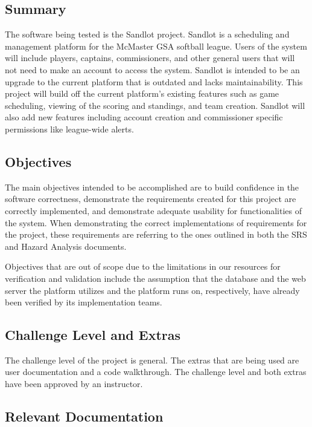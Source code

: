 \documentclass[12pt, titlepage]{article}
\begin{document}
\subsection{Summary}

The software being tested is the Sandlot project. Sandlot is a scheduling and
management platform for the McMaster GSA softball league. Users of the system
will include players, captains, commissioners, and other general users that will
not need to make an account to access the system. Sandlot is intended to be an
upgrade to the current platform that is outdated and lacks maintainability. This
project will build off the current platform's existing features such as game
scheduling, viewing of the scoring and standings, and team creation. Sandlot will
also add new features including account creation and commissioner specific
permissions like league-wide alerts.

\subsection{Objectives}

The main objectives intended to be accomplished are to build confidence in the software
correctness, demonstrate the requirements created for this project are correctly
implemented, and demonstrate adequate usability for functionalities of the
system. When demonstrating the correct implementations of requirements for the
project, these requirements are referring to the ones outlined in both the
SRS and Hazard Analysis documents.

Objectives that are out of scope due to the limitations in our resources for
verification and validation include the assumption that the database and the web
server the platform utilizes and the platform runs on, respectively, have already
been verified by its implementation teams.

\subsection{Challenge Level and Extras}

The challenge level of the project is general. The extras that are being used
are user documentation and a code walkthrough. The challenge level and both extras
have been approved by an instructor.

\subsection{Relevant Documentation}
\end{document}
